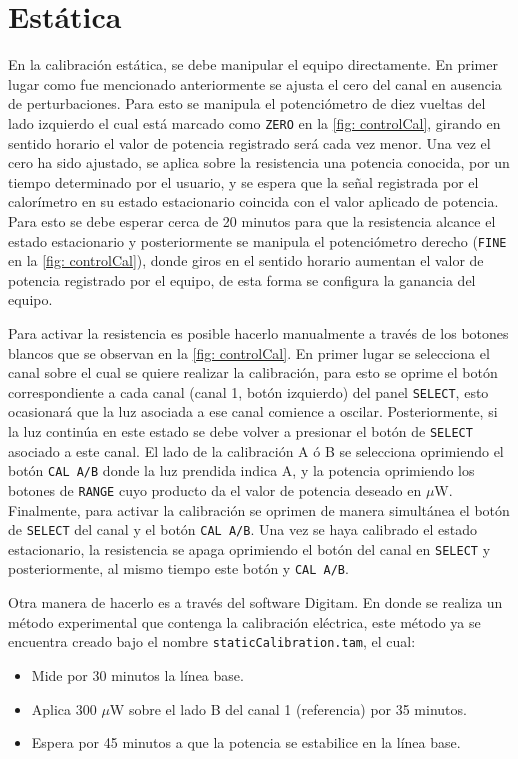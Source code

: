 	\section{Est\'atica}
	En la calibración estática, se debe manipular el equipo directamente. En primer lugar como fue mencionado anteriormente se ajusta el cero del canal en ausencia de perturbaciones. Para esto se manipula el potenciómetro de diez vueltas del lado izquierdo el cual está marcado como \texttt{ZERO} en la \autoref{fig: controlCal}, girando en sentido horario el valor de potencia registrado será cada vez menor. Una vez el cero ha sido ajustado, se aplica sobre la resistencia una potencia conocida, por un tiempo determinado por el usuario, y se espera que la señal registrada por el calorímetro en su estado estacionario coincida con el valor aplicado de potencia. Para esto se debe esperar cerca de 20 minutos para que la resistencia alcance el estado estacionario y posteriormente se manipula el potenciómetro derecho (\texttt{FINE} en la \autoref{fig: controlCal}), donde giros en el sentido horario aumentan el valor de potencia registrado por el equipo, de esta forma se configura la ganancia del equipo.

	Para activar la resistencia es posible hacerlo manualmente a través de los botones blancos que se observan en la \autoref{fig: controlCal}. En primer lugar se selecciona el canal sobre el cual se quiere realizar la calibración, para esto se oprime el botón correspondiente a cada canal (canal 1, botón izquierdo) del panel \texttt{SELECT}, esto ocasionará que la luz asociada a ese canal comience a oscilar. Posteriormente, si la luz continúa en este estado se debe volver a presionar el botón de \texttt{SELECT} asociado a este canal. El lado de la calibración A ó B se selecciona oprimiendo el botón \texttt{CAL A/B} donde la luz prendida indica A, y la potencia oprimiendo los botones de \texttt{RANGE} cuyo producto da el valor de potencia deseado en $\mu$W. Finalmente, para activar la calibración se oprimen de manera simultánea el botón de \texttt{SELECT} del canal y el botón \texttt{CAL A/B}. Una vez se haya calibrado el estado estacionario, la resistencia se apaga oprimiendo el botón del canal en \texttt{SELECT} y posteriormente, al mismo tiempo este botón y \texttt{CAL A/B}.
	
	Otra manera de hacerlo es a través del software Digitam. En donde se realiza un método experimental que contenga la calibración eléctrica, este método ya se encuentra creado bajo el nombre \texttt{staticCalibration.tam}, el cual:
	\begin{itemize}
		\item Mide por 30 minutos la línea base.
		\item Aplica 300 $\mu$W sobre el lado B del canal 1 (referencia) por 35 minutos.
		\item Espera por 45 minutos a que la potencia se estabilice en la línea base.
	\end{itemize}

